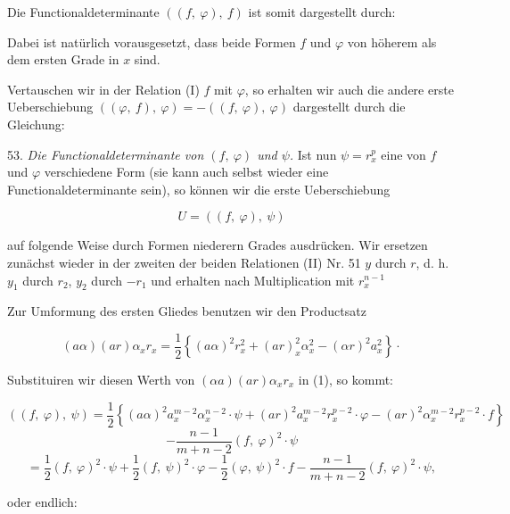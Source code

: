 Die Functionaldeterminante $((f,\ \varphi),\ f)$ ist somit dargestellt durch:


Dabei ist natürlich vorausgesetzt, dass beide Formen $f$ und $\varphi$ von höherem als dem ersten Grade in $x$ sind.

Vertauschen wir in der Relation (I) $f$ mit $\varphi$, so erhalten wir auch die andere erste Ueberschiebung $((\varphi,\ f),\ \varphi) = -((f,\ \varphi),\ \varphi)$ dargestellt durch die Gleichung:


53. \textit{Die Functionaldeterminante von $(f,\ \varphi)$ und $\psi$.} Ist nun $\psi = r_x^p$ eine von $f$ und $\varphi$ verschiedene Form (sie kann auch selbst wieder eine Functionaldeterminante sein), so können wir die erste Ueberschiebung

\[
U = ((f,\ \varphi),\ \psi)
\]

auf folgende Weise durch Formen niederern Grades ausdrücken. Wir ersetzen zunächst wieder in der zweiten der beiden Relationen (II) Nr. 51 $y$ durch $r$, d. h. $y_1$ durch $r_2$, $y_2$ durch $-r_1$ und erhalten nach Multiplication mit $r_x^{n-1}$


Zur Umformung des ersten Gliedes benutzen wir den Productsatz

\[
(a\alpha)(ar)\alpha_x r_x = \frac{1}{2}\left\{(a\alpha)^2 r_x^2 + (ar)_x^2\alpha_x^2 - (\alpha r)^2 a_x^2\right\}\cdot
\]

Substituiren wir diesen Werth von $(\alpha a)(ar)\alpha_x r_x$ in (1), so kommt:

\[
((f,\ \varphi),\ \psi) = \frac{1}{2}\left\{(a\alpha)^2 a_x^{m-2}\alpha_x^{n-2}\cdot\psi + (ar)^2 a_x^{m-2}r_x^{p-2}\cdot\varphi - (ar)^2\alpha_x^{m-2}r_x^{p-2}\cdot f\right\}
\]
\[
- \frac{n-1}{m+n-2}(f,\ \varphi)^2\cdot\psi
\]
\[
= \frac{1}{2}(f,\ \varphi)^2\cdot\psi + \frac{1}{2}(f,\ \psi)^2\cdot\varphi - \frac{1}{2}(\varphi,\ \psi)^2\cdot f - \frac{n-1}{m+n-2}(f,\ \varphi)^2\cdot\psi,
\]

oder endlich:

